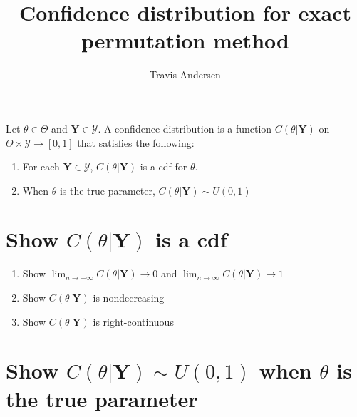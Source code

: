\documentclass{article}
\title{Confidence distribution for exact permutation method}
\author{Travis Andersen}
\begin{document}
\maketitle  

Let $\theta \in \Theta$ and $\textbf{Y} \in \mathcal{Y}$. A confidence distribution is a function $C(\theta|\textbf{Y})$ on $\Theta \times \mathcal{Y} \to [0, 1]$ that satisfies the following:

\begin{enumerate}
  \item For each $\textbf{Y} \in \mathcal{Y}$, $C(\theta|\textbf{Y})$ is a cdf for $\theta$. 
  \item When $\theta$ is the true parameter, $C(\theta|\textbf{Y}) \sim U(0, 1)$
\end{enumerate}

\section{Show $C(\theta|\textbf{Y})$ is a cdf}
\begin{enumerate}
  \item Show $\lim_{n \to -\infty} C(\theta|\textbf{Y}) \to 0$ and $\lim_{n \to \infty} C(\theta|\textbf{Y}) \to 1$
  \item Show $C(\theta|\textbf{Y})$ is nondecreasing
  \item Show $C(\theta|\textbf{Y})$ is right-continuous
\end{enumerate}

\section{Show $C(\theta|\textbf{Y}) \sim U(0, 1)$ when $\theta$ is the true parameter}
\end{document}
